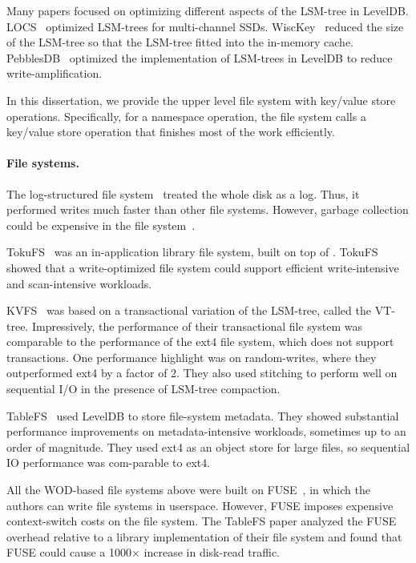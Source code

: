 Many papers focused on optimizing different aspects of the LSM-tree in LevelDB.
LOCS~\citep{locs} optimized LSM-trees for multi-channel SSDs.
WiscKey~\citep{wisckey} reduced the size of the LSM-tree
so that the LSM-tree fitted into the in-memory cache.
PebblesDB~\citep{pebble} optimized the implementation of LSM-trees in LevelDB to
reduce write-amplification.

In this dissertation,
we provide the upper level file system with key/value store operations.
Specifically, for a namespace operation, the file system calls a key/value
store operation that finishes most of the work efficiently.

\paragraph{File systems.}
The log-structured file system~\citep{lfs} treated the whole disk as a log.
Thus, it performed writes much faster than other file systems.
However, garbage collection could be expensive in the file system~\cite{lfsbsd}.

TokuFS~\citep{tokufs} was an in-application library file system,
built on top of \fti.
TokuFS showed that a write-optimized file system could support efficient
write-intensive and scan-intensive workloads.

KVFS~\citep{kvfs} was based on a transactional variation of the LSM-tree,
called the VT-tree.
Impressively, the performance of their transactional file system was
comparable to the performance of the ext4 file system,
which does not support transactions.
One performance highlight was on random-writes, where they outperformed ext4 by
a factor of 2.
They also used stitching to perform well on sequential I/O in the presence of
LSM-tree compaction.

TableFS~\citep{tablefs} used LevelDB to store file-system metadata.
They showed substantial performance improvements on metadata-intensive
workloads, sometimes up to an order of magnitude.
They used ext4 as an object store for large files, so sequential IO performance
was com-parable to ext4.

All the WOD-based file systems above were built on FUSE~\citep{fuse},
in which the authors can write file systems in userspace.
However, FUSE imposes expensive context-switch costs on the file system.
The TableFS paper analyzed the FUSE overhead relative to a library
implementation of their file system and
found that FUSE could cause a 1000× increase in disk-read traffic.

